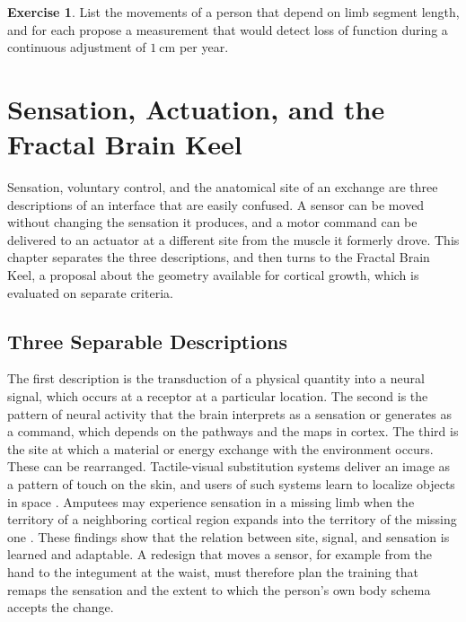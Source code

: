 \documentclass[11pt,openany]{book}
\theoremstyle{definition}
\newtheorem{exercise}{Exercise}[chapter]
\theoremstyle{remark}
\begin{document}
\begin{exercise}
List the movements of a person that depend on limb segment length, and for each propose a measurement that would detect loss of function during a continuous adjustment of $1\ \mathrm{cm}$ per year.
\end{exercise}

\chapter{Sensation, Actuation, and the Fractal Brain Keel}
\label{ch:brain}

Sensation, voluntary control, and the anatomical site of an exchange are three descriptions of an interface that are easily confused. A sensor can be moved without changing the sensation it produces, and a motor command can be delivered to an actuator at a different site from the muscle it formerly drove. This chapter separates the three descriptions, and then turns to the Fractal Brain Keel, a proposal about the geometry available for cortical growth, which is evaluated on separate criteria.

\section{Three Separable Descriptions}

The first description is the transduction of a physical quantity into a neural signal, which occurs at a receptor at a particular location. The second is the pattern of neural activity that the brain interprets as a sensation or generates as a command, which depends on the pathways and the maps in cortex. The third is the site at which a material or energy exchange with the environment occurs. These can be rearranged. Tactile-visual substitution systems deliver an image as a pattern of touch on the skin, and users of such systems learn to localize objects in space \cite{bachyrita1969}. Amputees may experience sensation in a missing limb when the territory of a neighboring cortical region expands into the territory of the missing one \cite{flor1995}. These findings show that the relation between site, signal, and sensation is learned and adaptable. A redesign that moves a sensor, for example from the hand to the integument at the waist, must therefore plan the training that remaps the sensation and the extent to which the person's own body schema accepts the change.
\end{document}
